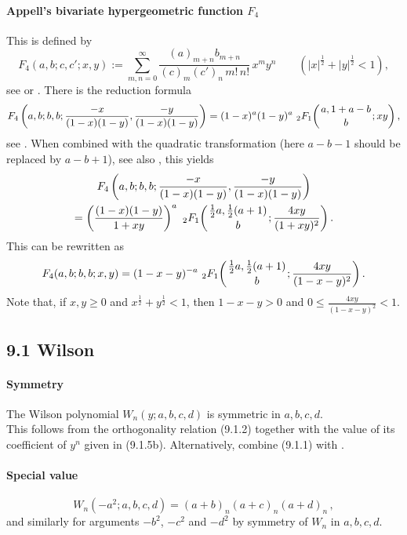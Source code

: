 \documentclass[twoside,11pt]{article}
\newcommand\half{\frac12}
\newcommand\thalf{\tfrac12}
\newcommand\iy\infty
\newcommand{\hyp}[5]{\,\mbox{}_{#1}F_{#2}\!\left(
  \genfrac{}{}{0pt}{}{#3}{#4};#5\right)}
\begin{document}
\paragraph{Appell's bivariate hypergeometric function $F_4$}
This is defined by
\begin{equation}
F_4(a,b;c,c';x,y):=\sum_{m,n=0}^\iy\frac{(a)_{m+n}b_{m+n}}{(c)_m(c')_n\,m!\,n!}\,
x^my^n\qquad(|x|^\half+|y|^\half<1),
\label{62}
\end{equation}
see \cite[5.7(9), 5.7(44)]{HTF1} or \cite[(16.3.4)]{DLMF}.
There is the reduction formula
\begin{equation*}
F_4\left(a,b;b,b;\frac{-x}{(1-x)(1-y)},\frac{-y}{(1-x)(1-y)}\right)=
(1-x)^a(1-y)^a\,\hyp21{a,1+a-b}b{xy},
\end{equation*}
see \cite[5.10(7)]{HTF1}. When combined with the quadratic transformation
\cite[2.11(34)]{HTF1} (here $a-b-1$ should be replaced by $a-b+1$),
see also \cite[(15.8.15)]{DLMF}, this yields
\begin{multline*}
F_4\left(a,b;b,b;\frac{-x}{(1-x)(1-y)},\frac{-y}{(1-x)(1-y)}\right)\\
=\left(\frac{(1-x)(1-y)}{1+xy}\right)^a\,
\hyp21{\thalf a,\thalf(a+1)}b{\frac{4xy}{(1+xy)^2}}.
\end{multline*}
This can be rewritten as
\begin{equation}
F_4(a,b;b,b;x,y)=(1-x-y)^{-a}\,\hyp21{\thalf a,\thalf(a+1)}b
{\frac{4xy}{(1-x-y)^2}}.
\label{63}
\end{equation}
Note that, if $x,y\ge0$ and $x^\half+y^\half<1$, then
$1-x-y>0$ and $0\le\frac{4xy}{(1-x-y)^2}<1$.
%
\subsection*{9.1 Wilson}
%
\paragraph{Symmetry}
The Wilson polynomial $W_n(y;a,b,c,d)$ is symmetric
in $a,b,c,d$.
\\
This follows from the orthogonality relation (9.1.2)
together with the value of its coefficient of $y^n$ given in (9.1.5b).
Alternatively, combine (9.1.1) with \cite[Theorem 3.1.1]{AAR}.
%
\paragraph{Special value}
\begin{equation}
W_n(-a^2;a,b,c,d)=(a+b)_n(a+c)_n(a+d)_n\,,
\label{91}
\end{equation}
and similarly for arguments $-b^2$, $-c^2$ and
$-d^2$ by symmetry of $W_n$ in $a,b,c,d$.
%
\end{document}
